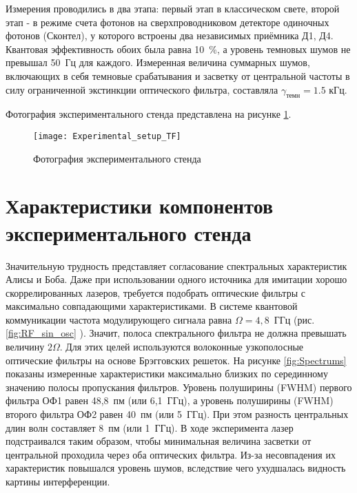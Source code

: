 Измерения проводились в два этапа: первый этап в классическом свете, второй этап - в режиме счета фотонов на сверхпроводниковом детекторе одиночных фотонов (Сконтел), у которого встроены два независимых приёмника Д1, Д4. Квантовая эффективность обоих была равна 10~\%, а уровень темновых шумов не превышал 50~Гц для каждого. Измеренная величина суммарных шумов, включающих в себя темновые срабатывания и засветку от центральной частоты в силу ограниченной экстинкции оптического фильтра, составляла $\gamma_{темн}=1.5$ кГц.

Фотография экспериментального стенда представлена на рисунке \ref{fig:experimental_setup_TF}.  

 \begin{figure}[ht]
  \centering
	 \texttt{[image: Experimental\_setup\_TF]}
  \caption{Фотография экспериментального стенда}
  \label{fig:experimental_setup_TF}
\end{figure}

\pagebreak

\section{Характеристики компонентов экспериментального стенда} \label{ch:ch5/sec2}

Значительную трудность представляет согласование спектральных характеристик Алисы и Боба. Даже при использовании одного источника для имитации хорошо скоррелированных лазеров, требуется подобрать оптические фильтры с максимально совпадающими характеристиками. В системе квантовой коммуникации частота модулирующего сигнала равна $\Omega = 4,8$~ГГц (рис.\ref{fig:RF_sin_osc} ). Значит, полоса спектрального фильтра не должна превышать величину $2\Omega$. Для этих целей используются волоконные узкополосные оптические фильтры на основе Брэгговских решеток. На рисунке \ref{fig:Spectrums} показаны измеренные характеристики максимально близких по серединному значению полосы пропускания фильтров. Уровень полуширины (FWHM) первого фильтра ОФ1 равен 48,8~пм (или 6,1~ГГц), а уровень полуширины (FWHM) второго фильтра ОФ2 равен 40~пм (или 5~ГГц). При этом разность центральных длин волн составляет 8~пм (или 1~ГГц). В ходе эксперимента лазер подстраивался таким образом, чтобы минимальная величина засветки от центральной проходила через оба оптических фильтра. Из-за несовпадения их характеристик повышался уровень шумов, вследствие чего ухудшалась видность картины интерференции.  

